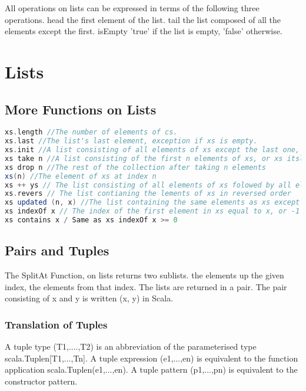 \documentclass[10pt, a4paper]{report}
\begin{document}
All operations on lists can be expressed in terms of the following three operations. head the first element of the list. tail the list composed of all the elements except the first. isEmpty 'true' if the list is empty, 'false' otherwise.\\

\chapter{Lists}

\section{More Functions on Lists}

\begin{lstlisting}[language=scala]
xs.length //The number of elements of cs.
xs.last //The list's last element, exception if xs is empty.
xs.init //A list consisting of all elements of xs except the last one, exception if xs is empty.
xs take n //A list consisting of the first n elements of xs, or xs itslef if it is shorter than n
xs drop n //The rest of the collection after taking n elements
xs(n) //The element of xs at index n
xs ++ ys // The list consisting of all elements of xs folowed by all elements of ys
xs.revers // The list contianing the lements of xs in reversed order
xs updated (n, x) //The list containing the same elements as xs except at index n where in contains x
xs indexOf x // The index of the first element in xs equal to x, or -1 if x does not appear in xs
xs contains x / Same as xs indexOf x >= 0

\end{lstlisting}

\section{Pairs and Tuples}

The SplitAt Function, on lists returns two sublists. the elements up the given index, the elements from that index. The lists are returned in a pair. The pair consisting of x and y is written (x, y) in Scala.

\subsection{Translation of Tuples}

A tuple type (T1,....,T2) is an abbreviation of the parameterised type scala.Tuplen[T1,...,Tn]. A tuple expression (e1,...,en) is equivalent to the function application scala.Tuplen(e1,...,en). A tuple pattern (p1,...,pn) is equivalent to the constructor pattern.
\end{document}
